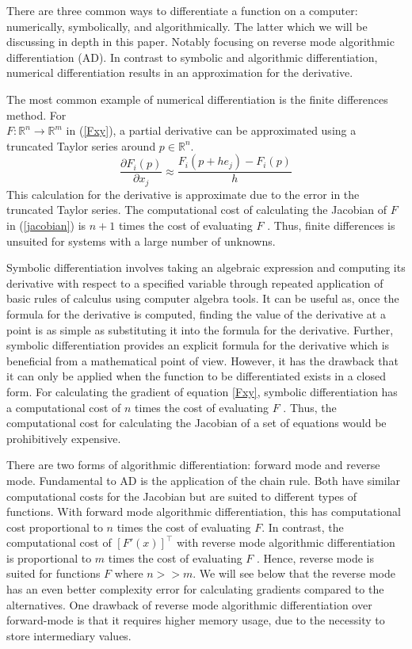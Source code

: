 \documentclass{article}
\begin{document}
There are three common ways to differentiate a function on a computer: numerically, symbolically, and algorithmically. The latter which we will be discussing in depth in this paper. Notably focusing on reverse mode algorithmic differentiation (AD). In contrast to symbolic and algorithmic differentiation, numerical differentiation results in an approximation for the derivative.

The most common example of numerical differentiation is the finite differences method. For \\ $F: \mathbb{R}^n \longrightarrow \mathbb{R}^m$ in (\ref{Fxy}), a partial derivative can be approximated using a truncated Taylor series around $p \in \mathbb{R}^n$. 
\begin{equation*}
    \frac{\partial F_i (p)}{\partial x_j} \approx \frac{F_i(p+he_j) - F_i(p)}{h}
\end{equation*}
This calculation for the derivative is approximate due to the error in the truncated Taylor series. The computational cost of calculating the Jacobian of $F$ in (\ref{jacobian}) is $n + 1$ times the cost of evaluating $F$ \cite{chem}. Thus, finite differences is unsuited for systems with a large number of unknowns.

Symbolic differentiation involves taking an algebraic expression and computing its derivative with respect to a specified variable through repeated application of basic rules of calculus using computer algebra tools. It can be useful as, once the formula for the derivative is computed, finding the value of the derivative at a point is as simple as substituting it into the formula for the derivative.  Further, symbolic differentiation provides an explicit formula for the derivative which is beneficial from a mathematical point of view. However, it has the drawback that it can only be applied when the function to be differentiated exists in a closed form. For calculating the gradient of equation \ref{Fxy}, symbolic differentiation has a computational cost of $n$ times the cost of evaluating $F$ \cite{chem}. Thus, the computational cost for calculating the Jacobian of a set of equations would be prohibitively expensive.

There are two forms of algorithmic differentiation: forward mode and reverse mode. Fundamental to AD is the application of the chain rule. Both have similar computational costs for the Jacobian but are suited to different types of functions. With forward mode algorithmic differentiation, this has computational cost proportional to $n$ times the cost of evaluating $F$. In contrast, the computational cost of $[F'(x)]^\top$ with reverse mode algorithmic differentiation is proportional to $m$ times the cost of evaluating $F$ \cite{falisse}. Hence, reverse mode is suited for functions $F$ where $n >> m$. We will see below that the reverse mode has an even better complexity error for calculating gradients compared to the alternatives. One drawback of reverse mode algorithmic differentiation over forward-mode is that it requires higher memory usage, due to the necessity to store intermediary values.
\end{document}
